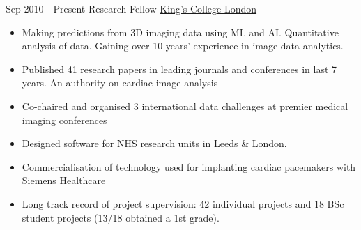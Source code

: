 \documentclass[letterpaper]{twentysecondcv} %
\begin{document}
\begin{twenty} %
\twentyitem
    	{Sep 2010 -}
		{Present}
        {Research Fellow}
        {\href{https://kclpure.kcl.ac.uk/portal/rashed.karim.html}{King's College London}}
        {}
        {\begin{itemize}
       \item Making predictions from 3D imaging data using ML and AI. Quantitative analysis of data. Gaining over 10 years' experience in image data analytics. 
\item Published 41 research papers in leading journals and conferences in last 7 years. An authority on cardiac image analysis
\item Co-chaired and organised 3 international data challenges at premier medical imaging conferences
\item Designed software for NHS research units in Leeds \& London. 
\item Commercialisation of technology used for implanting cardiac pacemakers with Siemens Healthcare
\item Long track record of project supervision: 42 individual projects and 18 BSc student projects (13/18 obtained a 1st grade). 
       

\end{itemize}}
\end{twenty}
\end{document}
